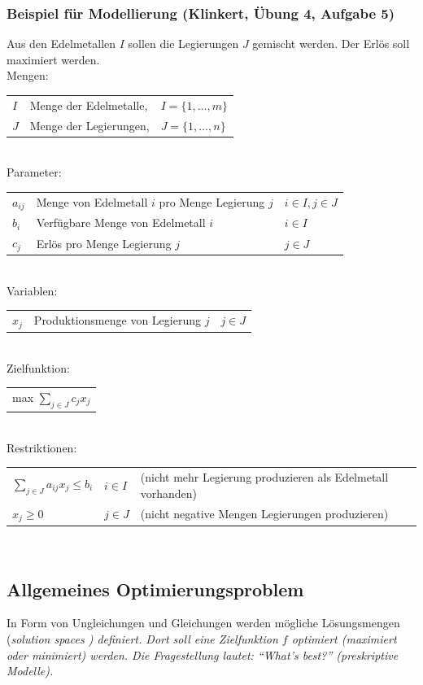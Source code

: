   \subsubsection{Beispiel für Modellierung (Klinkert, Übung 4, Aufgabe 5)}
    Aus den Edelmetallen $I$ sollen die Legierungen $J$ gemischt werden. Der Erlös soll maximiert werden.\\
    Mengen:\\
    \begin{tabular}{lll}
      $I$ & Menge der Edelmetalle, &$I = \{1, \ldots, m\}$\\
      $J$ & Menge der Legierungen, &$J = \{1, \ldots, n\}$
    \end{tabular}\\
    Parameter:\\
    \begin{tabular}{lll}
      $a_{ij}$ & Menge von Edelmetall $i$ pro Menge Legierung $j$ & $i \in I, j \in J$\\
      $b_i$    & Verfügbare Menge von Edelmetall $i$              & $i \in I$\\
      $c_j$    & Erlös pro Menge Legierung $j$                    & $j \in J$\\
    \end{tabular}\\
    Variablen:\\
    \begin{tabular}{lll}
      $x_j$ & Produktionsmenge von Legierung $j$ & $j \in J$\\
    \end{tabular}\\
    Zielfunktion:\\
    \begin{tabular}{l}
      max $\sum\limits_{j \in J}c_j x_j$\\
    \end{tabular}\\
    Restriktionen:\\
    \begin{tabular}{lll}
      $\sum\limits_{j \in J}a_{ij}x_j \le b_i$ & $i \in I$ & (nicht mehr Legierung produzieren als Edelmetall vorhanden)\\
      $x_j \ge 0$                       & $j \in J$ & (nicht negative Mengen Legierungen produzieren)
    \end{tabular}\\




\subsection{Allgemeines Optimierungsproblem }
  In Form von Ungleichungen und Gleichungen werden mögliche Lösungsmengen (\em solution spaces \em) definiert. Dort soll eine Zielfunktion $f$ optimiert (maximiert oder minimiert) werden. Die Fragestellung lautet: "`What's best?"' (preskriptive Modelle).
  
